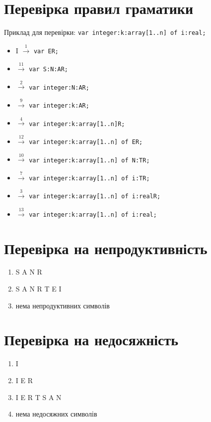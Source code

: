 \newpage
\section{Перевірка правил граматики}
Приклад для перевірки: \verb|var integer:k:array[1..n] of i:real;|
\begin{itemize}
    \item[]  I $\xrightarrow{1}$  \verb|var ER;|
    \item[]    $\xrightarrow{11}$ \verb|var S:N:AR;|
    \item[]    $\xrightarrow{2}$  \verb|var integer:N:AR;|
    \item[]    $\xrightarrow{9}$  \verb|var integer:k:AR;|
    \item[]    $\xrightarrow{4}$  \verb|var integer:k:array[1..n]R;|
    \item[]    $\xrightarrow{12}$ \verb|var integer:k:array[1..n] of ER;|
    \item[]    $\xrightarrow{10}$ \verb|var integer:k:array[1..n] of N:TR;|
    \item[]    $\xrightarrow{7}$  \verb|var integer:k:array[1..n] of i:TR;|
    \item[]    $\xrightarrow{3}$  \verb|var integer:k:array[1..n] of i:realR;|
    \item[]    $\xrightarrow{13}$ \verb|var integer:k:array[1..n] of i:real;|
\end{itemize}

\newpage
\section{Перевірка на непродуктивність}
\begin{enumerate}
    \item[]  S A N R
    \item[]  S A N R T E I
    \item[]  нема непродуктивних символів
\end{enumerate}

\section{Перевірка на недосяжність}
\begin{enumerate}
    \item[]  I
    \item[]  I E R
    \item[]  I E R T S A N
    \item[]  нема недосяжних символів
\end{enumerate}


